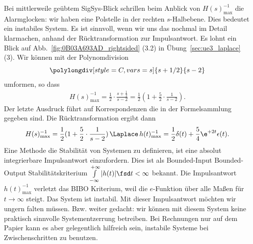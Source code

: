 \begin{ExCalc}
Bei mittlerweile geübtem SigSys-Blick schrillen beim Anblick von
$H(s)_\mathrm{max}^{-1}$
die Alarmglocken: wir haben eine Polstelle in der rechten $s$-Halbebene.
Dies bedeutet ein instabiles System.
Es ist sinnvoll, wenn wir uns das nochmal im Detail klarmachen, anhand der
Rücktransformation zur Impulsantwort.
Es lohnt ein Blick auf Abb.~\ref{fig:0B03A693AD_rightsided} (3.2) in Übung~\ref{sec:ue3_laplace} (3).
%
Wir können mit der Polynomdivision
$$\polylongdiv[style=C, vars=s]{s+1/2}{s-2}$$
umformen, so dass
\begin{align}
H(s)_\mathrm{max}^{-1} = \frac{1}{2}\cdot\frac{s+\frac{1}{2}}{s-2}
= \frac{1}{2} ( 1 + \frac{5}{2}\cdot\frac{1}{s-2}).
\end{align}
%
Der letzte Ausdruck führt auf Korrespondenzen die in der Formelsammlung gegeben
sind.
Die Rücktransformation ergibt dann
\begin{align}
H(s)_\mathrm{max}^{-1} = \frac{1}{2} ( 1 + \frac{5}{2}\cdot\frac{1}{s-2})
\,\Laplace\,
h(t)_\mathrm{max}^{-1} = \frac{1}{2}\delta(t) + \frac{5}{4}\e^{+2 t}\epsilon(t).
\end{align}
%
Eine Methode die Stabilität von Systemen zu definieren, ist eine absolut
integrierbare Impulsantwort einzufordern. Dies ist als Bounded-Input Bounded-Output
Stabilitätskriterium
$\int\limits_{-\infty}^{+\infty} |h(t)|\fsd t < \infty$
bekannt.
Die Impulsantwort $h(t)_\mathrm{max}^{-1} $ verletzt das BIBO Kriterium, weil
die $e$-Funktion über alle Maßen für $t\to\infty$ steigt. Das System ist
instabil.
Mit dieser Impulsantwort möchten wir ungern falten müssen.
Bzw. weiter gedacht: wir können mit diesem System keine praktisch sinnvolle
Systementzerrung betreiben.
%
Bei Rechnungen nur auf dem Papier kann es aber gelegentlich hilfreich sein,
instabile Systeme bei Zwischenschritten zu benutzen.
\end{ExCalc}

